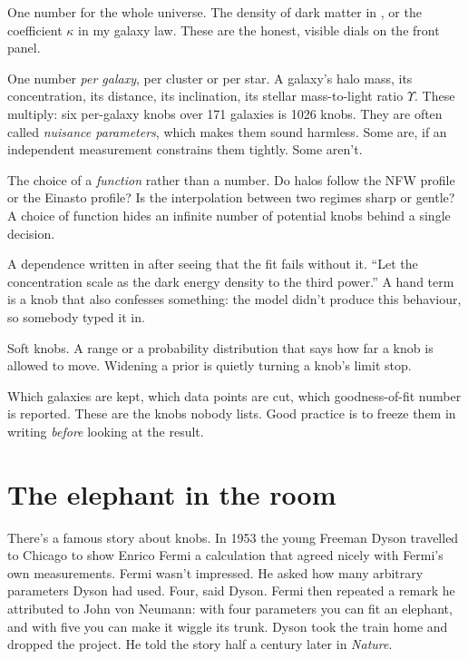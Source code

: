 \begin{description}[leftmargin=1em,style=nextline]
\item[Global knobs.] One number for the whole universe. The density of dark matter in \LCDM, or the coefficient $\kappa$ in my galaxy law. These are the honest, visible dials on the front panel.
\item[Per-object knobs.] One number \emph{per galaxy}, per cluster or per star. A galaxy's halo mass, its concentration, its distance, its inclination, its stellar mass-to-light ratio $\Upsilon$. These multiply: six per-galaxy knobs over 171 galaxies is 1026 knobs. They are often called \emph{nuisance parameters}, which makes them sound harmless. Some are, if an independent measurement constrains them tightly. Some aren't.
\item[Shape knobs.] The choice of a \emph{function} rather than a number. Do halos follow the NFW profile or the Einasto profile? Is the interpolation between two regimes sharp or gentle? A choice of function hides an infinite number of potential knobs behind a single decision.
\item[Hand terms.] A dependence written in after seeing that the fit fails without it. ``Let the concentration scale as the dark energy density to the third power.'' A hand term is a knob that also confesses something: the model didn't produce this behaviour, so somebody typed it in.
\item[Priors.] Soft knobs. A range or a probability distribution that says how far a knob is allowed to move. Widening a prior is quietly turning a knob's limit stop.
\item[Choices of sample and statistic.] Which galaxies are kept, which data points are cut, which goodness-of-fit number is reported. These are the knobs nobody lists. Good practice is to freeze them in writing \emph{before} looking at the result.
\end{description}

\section{The elephant in the room}

There's a famous story about knobs. In 1953 the young Freeman Dyson travelled to Chicago to show Enrico Fermi a calculation that agreed nicely with Fermi's own measurements. Fermi wasn't impressed. He asked how many arbitrary parameters Dyson had used. Four, said Dyson. Fermi then repeated a remark he attributed to John von Neumann: with four parameters you can fit an elephant, and with five you can make it wiggle its trunk. Dyson took the train home and dropped the project. He told the story half a century later in \emph{Nature}.

